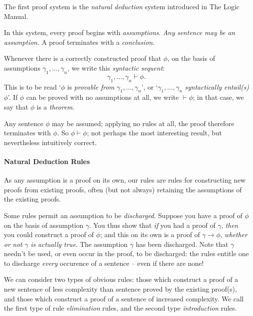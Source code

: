 The first proof system is the \emph{natural deduction} system introduced in The Logic Manual. 

In this system, every proof begins with \emph{assumptions}. \emph{Any sentence may be an assumption.} A proof terminates with a \emph{conclusion}. 

 Whenever there is a correctly constructed proof that $\phi$, on the basis of assumptions $\gamma_{1},\ldots,\gamma_{n}$, we write this \emph{syntactic sequent}: {$$\gamma_{1},\ldots,\gamma_{n}\vdash\phi.$$} This is to be read `$\phi$ is \emph{provable from} $\gamma_{1},\ldots,\gamma_{n}$', or `$\gamma_{1},\ldots,\gamma_{n}$ \emph{syntactically entail(s)} $\phi$'. If $\phi$ can be proved with no assumptions at all, we write $\vdash\phi$; in that case, we say that $\phi$ is a \emph{theorem}.

Any sentence $\phi$ may be assumed; applying no rules at all, the proof therefore terminates with $\phi$. So $\phi\vdash\phi$; not perhaps the most interesting result, but nevertheless intuitively correct.




\paragraph{Natural Deduction Rules}

 As any assumption is a proof on its own, our rules are rules for constructing new proofs from existing proofs, often (but not always) retaining the assumptions of the existing proofs.

Some rules permit an assumption to be \emph{discharged}. Suppose you have a proof of $\phi$ on the basis of assumption $\gamma$.  You thus show that \emph{if} you had a proof of $\gamma$, \emph{then} you could construct a proof of $\phi$; and this on its own is a proof of $\gamma\to\phi$, \emph{whether or not $\gamma$ is actually true}. The assumption $\gamma$ has been discharged.
 Note that $\gamma$ needn't be used, or even occur in the proof, to be discharged: the rules entitle one to discharge \emph{every} occurence of a sentence – even if there are none!

 We can consider two types of obvious rules: those which construct a proof of a new sentence of less complexity than sentence proved by the existing proof(s), and those which construct a proof of a sentence of increased complexity. We call the first type of rule \emph{elimination} rules, and the second type \emph{introduction} rules.





